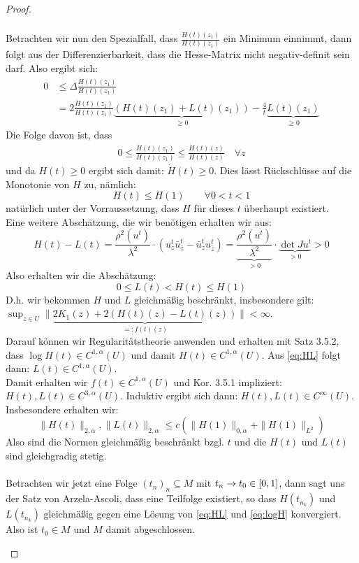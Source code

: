 \begin{proof}
\begin{itemize}
\begin{align*}
      \end{align*}
      Betrachten wir nun den Spezialfall, dass $\frac{\dot H(t)(z_1)}{H(t)(z_1)}$ ein Minimum einnimmt, dann folgt aus der Differenzierbarkeit, dass die Hesse-Matrix nicht negativ-definit sein darf. Also ergibt sich:
      \begin{align*}
	0 & \leq \Delta \frac{\dot H(t)(z_1)}{H(t)(z_1)} \\
	& =  2 \frac{\dot H(t)(z_1)}{H(t)(z_1)} \underbrace{(H(t)(z_1) + L(t)(z_1))}_{ \geq 0} - \frac4t \underbrace{L(t)(z_1)}_{\geq 0}
      \end{align*}
      Die Folge davon ist, dass
      \begin{align*}
	0 \leq \frac{\dot H(t)(z_1)}{H(t)(z_1)} \leq \frac{\dot H(t)(z)}{H(t)(z)} \quad \forall z
      \end{align*}
      und da $H(t) \geq 0$ ergibt sich damit: $\dot H(t) \geq 0$. Dies lässt Rückschlüsse auf die Monotonie von $H$ zu, nämlich:
      \[
      H(t) \leq H(1) \qquad \forall 0 < t < 1
      \]
      natürlich unter der Vorraussetzung, dass $H$ für dieses $t$ überhaupt existiert. \\
      Eine weitere Abschätzung, die wir benötigen erhalten wir aus:
      \[
      H(t) - L(t) = \frac{\rho^2(u^t)}{\lambda^2} \cdot ( u^t_z \bar u^t_{\bar z} - \bar u^t_z u^t_{\bar z} ) = \underbrace{\frac{\rho^2(u^t)}{\lambda^2}}_{> 0} \cdot \underbrace{ \det Ju^t }_{> 0} > 0
      \]
      Also erhalten wir die Abschätzung:
      \[
      0 \leq L(t) < H(t) \leq H(1)
      \]
      D.h. wir bekommen $H$ und $L$ gleichmäßig beschränkt, insbesondere gilt: $\sup_{z \in U} \| \underbrace{2K_1(z) + 2(H(t)(z) - L(t)(z))}_{=:f(t)(z)} \| < \infty$. \\
      Darauf können wir Regularitätstheorie anwenden und erhalten mit Satz 3.5.2, dass $\log H(t) \in C^{1,\alpha}(U)$ und damit $H(t) \in C^{1,\alpha}(U)$. Aus \eqref{eq:HL} folgt dann: $L(t) \in C^{1, \alpha}(U)$. \\
      Damit erhalten wir $f(t) \in C^{1,\alpha}(U)$ und Kor. 3.5.1 impliziert: $H(t),L(t) \in C^{3,\alpha}(U)$. Induktiv ergibt sich dann: $H(t), L(t) \in C^\infty(U)$. Insbesondere erhalten wir:
      \[
      \|H(t)\|_{2, \alpha}, \|L(t)\|_{2, \alpha} \leq c ( \|H(1)\|_{0, \alpha} + \|H(1)\|_{L^2})
      \]
      Also sind die Normen gleichmäßig beschränkt bzgl. $t$ und die $H(t)$ und $L(t)$ sind gleichgradig stetig. \\
      \\
      Betrachten wir jetzt eine Folge $(t_n)_n \subseteq M$ mit $t_n \rightarrow t_0 \in [0,1]$, dann sagt uns der Satz von Arzela-Ascoli, dass eine Teilfolge existiert, so dass $H(t_{n_k})$ und $L(t_{n_k})$ gleichmäßig gegen eine Lösung von \eqref{eq:HL} und \eqref{eq:logH} konvergiert. Also ist $t_0 \in M$ und $M$ damit abgeschlossen.


  \end{itemize}
\end{proof}

